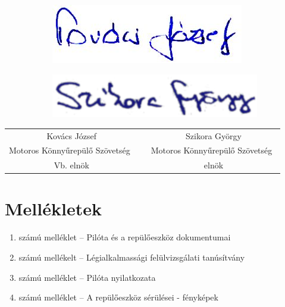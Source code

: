 \documentclass[a4paper,10pt]{article}
\newcommand{\mksz}{Motoros Könnyűrepülő Szövetség\ }
\begin{document}
\vspace{1cm}
\begin{figure}[h!]
\centering
\begin{subfigure}[h!]{0.30\textwidth}
\includegraphics{kepek/sign/kj}
\end{subfigure}
\hspace{4cm}
\begin{subfigure}[h!]{0.30\textwidth}
\includegraphics{kepek/sign/szgy}
\end{subfigure}
\end{figure}

\begin{tabular*}{16cm}{ccc}
 Kovács József&\hspace{3cm} &Szikora György\\
 \mksz&\hspace{3cm} &\mksz\\
 Vb. elnök&\hspace{3cm} &elnök\\
\end{tabular*}

\pagebreak
\section{Mellékletek}
\begin{enumerate}
 \item számú melléklet -- Pilóta és a repülőeszköz dokumentumai
 \item számú mellékelt -- Légialkalmassági felülvizsgálati tanúsítvány
 \item számú melléklet -- Pilóta nyilatkozata
 \item számú melléklet -- A repülőeszköz sérülései - fényképek
\end{enumerate}
\end{document}
